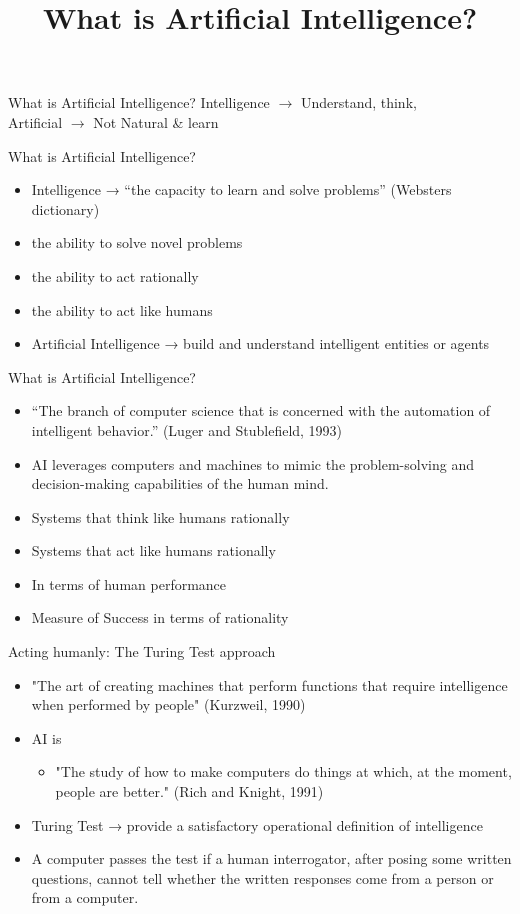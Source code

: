 \documentclass{beamer}
\title{What is Artificial Intelligence?}
\begin{document}
\begin{frame}
    \titlepage
\end{frame}

\begin{frame}{What is Artificial Intelligence?}
Intelligence \(\rightarrow\) Understand, think, \\
Artificial \(\rightarrow\) Not Natural \& learn
\end{frame}

\begin{frame}{What is Artificial Intelligence?}
\begin{itemize}
\item Intelligence → “the capacity to learn and solve problems” (Websters dictionary)
\item the ability to solve novel problems
\item the ability to act rationally
\item the ability to act like humans
\item Artificial Intelligence → build and understand intelligent entities or agents
\end{itemize}
\end{frame}

\begin{frame}{What is Artificial Intelligence?}
\begin{itemize}
\item “The branch of computer science that is concerned with the automation of intelligent behavior.” (Luger and Stublefield, 1993)
\item AI leverages computers and machines to mimic the problem-solving and decision-making capabilities of the human mind.
\item Systems that think like humans rationally
\item Systems that act like humans rationally
\item In terms of human performance
\item Measure of Success in terms of rationality
\end{itemize}
\end{frame}

\begin{frame}{Acting humanly: The Turing Test approach}
\begin{itemize}
\item "The art of creating machines that perform functions that require intelligence when performed by people"
(Kurzweil, 1990)
\item AI is
\begin{itemize}
\item "The study of how to make computers do things at which, at the moment, people are better."
(Rich and Knight, 1991)
\end{itemize}
\item Turing Test → provide a satisfactory operational definition of intelligence
\item A computer passes the test if a human interrogator, after posing some written questions, cannot tell whether the written responses come from a person or from a computer.
\end{itemize}
\end{frame}
\end{document}
